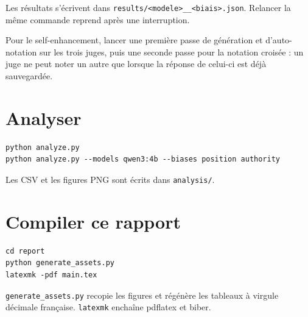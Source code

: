 Les résultats s'écrivent dans \texttt{results/<modele>\_\_<biais>.json}. Relancer la même commande reprend après une interruption.

Pour le self-enhancement, lancer une première passe de génération et d'auto-notation sur les trois juges, puis une seconde passe pour la notation croisée : un juge ne peut noter un autre que lorsque la réponse de celui-ci est déjà sauvegardée.

\section{Analyser}

\begin{lstlisting}
python analyze.py
python analyze.py --models qwen3:4b --biases position authority
\end{lstlisting}

Les CSV et les figures PNG sont écrits dans \texttt{analysis/}.

\section{Compiler ce rapport}

\begin{lstlisting}
cd report
python generate_assets.py
latexmk -pdf main.tex
\end{lstlisting}

\texttt{generate\_assets.py} recopie les figures et régénère les tableaux à virgule décimale française. \texttt{latexmk} enchaîne pdflatex et biber.
